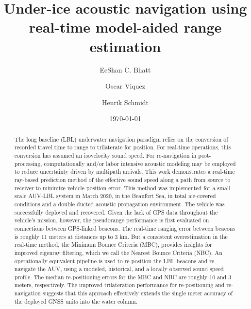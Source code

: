 \title[JASA/draft]{Under-ice acoustic navigation using real-time model-aided range estimation}
\author{EeShan C. Bhatt}
\author{Oscar Viquez}
\author{Henrik Schmidt}



\date{\today}

\begin{abstract}
The long baseline (LBL) underwater navigation paradigm relies on the conversion of recorded travel time to range to trilaterate for position.
For real-time operations, this conversion has assumed an isovelocity sound speed.
For re-navigation in post-processing, computationally and/or labor intensive acoustic modeling may be employed to reduce uncertainty driven by multipath arrivals.
This work demonstrates a real-time ray-based prediction method of the effective sound speed along a path from source to receiver to minimize vehicle position error.
 This method was implemented for a small scale AUV-LBL system in March 2020, in the Beaufort Sea, in total ice-covered conditions and a double ducted acoustic propagation environment.
The vehicle was successfully deployed and recovered.
 Given the lack of GPS data throughout the vehicle's mission, however, the pseudorange performance is first evaluated on connections between GPS-linked beacons.
The real-time ranging error between beacons is roughly 11 meters at distances up to 3 km.
But a consistent overestimation in the real-time method, the Minimum Bounce Criteria (MBC), provides insights for improved eigenray filtering, which we call the Nearest Bounce Criteria (NBC).
An operationally equivalent pipeline is used to re-position the LBL beacons and re-navigate the AUV, using a modeled, historical, and a locally observed sound speed profile.
The median re-positioning errors for the MBC and NBC are roughly 10 and 3 meters, respectively.
The improved trilateration performance for re-positioning and re-navigation suggests that this approach effectively extends the single meter accuracy of the deployed GNSS units into the water column. 
\end{abstract}


